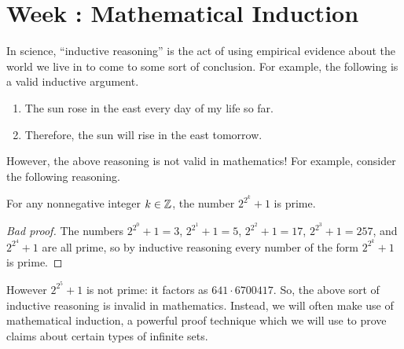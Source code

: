 \documentclass[../notes.tex]{subfiles}
\begin{document}
\section{Week \theweek: Mathematical Induction}
In science, ``inductive reasoning'' is the act of using empirical evidence about the world we live in to come to some sort of conclusion. For example, the following is a valid inductive argument.
\begin{enumerate}
    \item The sun rose in the east every day of my life so far.
    \item Therefore, the sun will rise in the east tomorrow.
\end{enumerate}
However, the above reasoning is not valid in mathematics! For example, consider the following reasoning.
\begin{badtheorem}
    For any nonnegative integer $k \in \mathbb Z$, the number $2^{2^k} + 1$ is prime.
\end{badtheorem}
\begin{proof}[Bad proof]
    The numbers $2^{2^0} + 1 = 3$, $2^{2^1} + 1 = 5$, $2^{2^2} + 1 = 17$, $2^{2^3} + 1 = 257$, and $2^{2^4} + 1$ are all prime, so by inductive reasoning every number of the form $2^{2^k} + 1$ is prime.
\end{proof}
However $2^{2^5} + 1$ is not prime: it factors as $641 \cdot 6700417$. So, the above sort of inductive reasoning is invalid in mathematics. Instead, we will often make use of mathematical induction, a powerful proof technique which we will use to prove claims about certain types of infinite sets.
\end{document}
